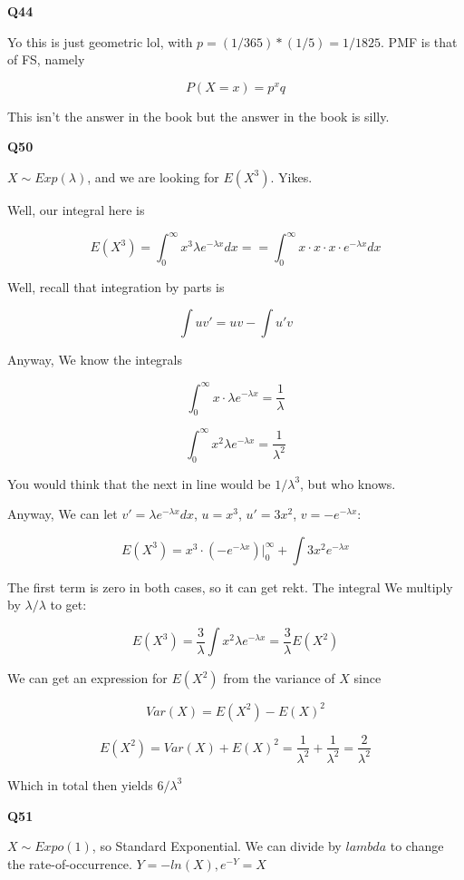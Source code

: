 \documentclass{article}
\begin{document}
		\textbf{Q44}		
		
			Yo this is just geometric lol, with $p = (1/365)*(1/5) = 1/1825$. PMF is that of FS, namely
			
			\[ P(X = x) = p^xq\]
		
			This isn't the answer in the book but the answer in the book is silly.
			
			\hfill
			
		\textbf{Q50}
		
			$X\sim Exp(\lambda)$, and we are looking for $E(X^3)$. Yikes.
			
			Well, our integral here is
			
			\[ E(X^3) = \int_0^\infty x^3 \lambda e^{-\lambda x} dx = = \int_0^\infty x\cdot x\cdot x\cdot e^{-\lambda x} dx \]
		
			Well, recall that integration by parts is
			
			\[ \int uv' = uv - \int u'v \]
			
			Anyway, We know the integrals
			
			\[ \int^\infty_0 x\cdot\lambda e^{-\lambda x} = \frac{1}{\lambda} \]
			
			\[ \int^\infty_0 x^2\lambda e^{-\lambda x} = \frac{1}{\lambda^2} \]
			
			You would think that the next in line would be $1/\lambda^3$, but who knows.
			
			Anyway, We can let $v' = \lambda e^{-\lambda x}dx$, $u = x^3$, $u' = 3x^2$, $v = -e^{-\lambda x}$:
			
			\[ E(X^3) = x^3\cdot (-e^{-\lambda x})\big|^\infty_0 + \int 3x^2e^{-\lambda x}\]
		
			The first term is zero in both cases, so it can get rekt. The integral We multiply by $\lambda/\lambda$ to get:
		
			\[ E(X^3) = \frac{3}{\lambda}\int x^2\lambda e^{-\lambda x} = \frac{3}{\lambda}E(X^2) \]
		
			We can get an expression for $E(X^2)$ from the variance of $X$ since
			
			\[ Var(X) = E(X^2) - E(X)^2 \]
			
			\[ E(X^2) = Var(X) + E(X)^2 = \frac{1}{\lambda^2} + \frac{1}{\lambda^2} = \frac{2}{\lambda^2} \]
		
			Which in total then yields $6/\lambda^3$
			
			\hfill
			
		\textbf{Q51}
		
			$X\sim Expo(1)$, so Standard Exponential. We can divide by $lambda$ to change the rate-of-occurrence. $Y = -ln(X), e^{-Y} = X$
			
\end{document}

